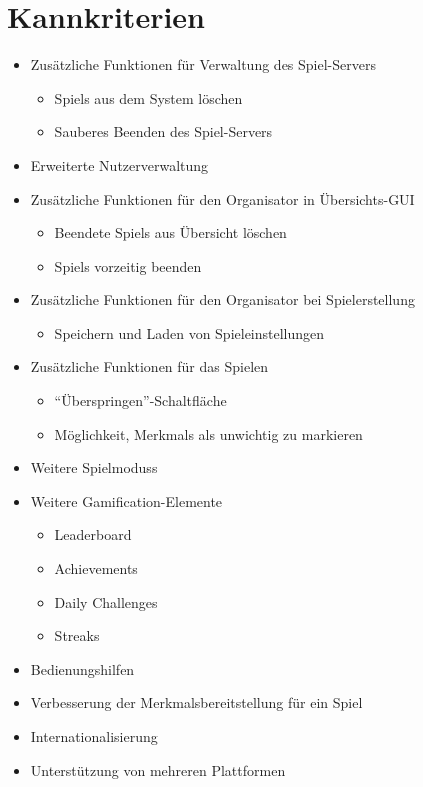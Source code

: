 \documentclass[a4paper]{scrreprt}
\begin{document}
    \section{Kannkriterien}
    \begin{itemize} %
    	\item Zusätzliche Funktionen für Verwaltung des \Gls{Spiel-Server}s
   	\begin{itemize}
            \item \Glspl{Spiel} aus dem System löschen
            \item Sauberes Beenden des \Gls{Spiel-Server}s
        \end{itemize}
	\item Erweiterte Nutzerverwaltung
	\item Zusätzliche Funktionen für den \Gls{Organisator} in Übersichts-GUI
        \begin{itemize}
            \item Beendete \Glspl{Spiel} aus Übersicht löschen
            \item \Glspl{Spiel} vorzeitig beenden
        \end{itemize}
	\item Zusätzliche Funktionen für den \Gls{Organisator} bei Spielerstellung
        \begin{itemize}
            \item Speichern und Laden von \Gls{Spieleinstellungen}
        \end{itemize}
        \item Zusätzliche Funktionen für das Spielen 
        \begin{itemize}
            \item \enquote{Überspringen}-Schaltfläche 
            \item Möglichkeit, \Glspl{Merkmal} als unwichtig zu markieren 
        \end{itemize}
	\item Weitere \Glspl{Spielmodus}
	\item Weitere Gamification-Elemente
        \begin{itemize}
            \item Leaderboard %
            \item \Glspl{Achievement}
            \item Daily Challenges %
            \item Streaks %
        \end{itemize}
        \item Bedienungshilfen 
        \item Verbesserung der Merkmalsbereitstellung für ein \Gls{Spiel}
        \item Internationalisierung 
        \item Unterstützung von mehreren Plattformen
    \end{itemize}
\end{document}
